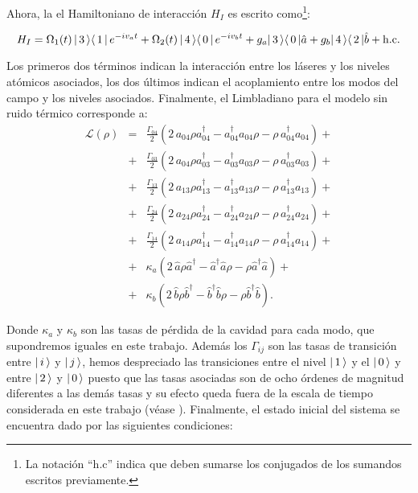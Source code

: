 \quad Ahora, la el Hamiltoniano de interacci\'on $H_I$ es escrito como\footnote{La notaci\'on ``h.c'' indica que deben sumarse los conjugados de los sumandos escritos previamente.}:

\begin{equation}
 H_I=\Omega_1(t)\,\vert\, 3 \,\rangle\langle\, 1 \,\vert\,e^{-iv_a t}+\Omega_2(t)\,\vert\, 4 \,\rangle\langle\, 0 \,\vert\,e^{-iv_bt}+g_a\vert\, 3 \,\rangle\langle\, 0 \,\vert\hat{a}+g_b\vert\, 4 \,\rangle\langle\, 2 \,\vert\hat{b}+\mbox{h.c}.\label{ec:HI}
\end{equation}

\quad Los primeros dos t\'erminos indican la interacci\'on entre los l\'aseres y los niveles at\'omicos asociados, los dos \'ultimos indican el acoplamiento entre los modos del campo y los niveles asociados. Finalmente, el Limbladiano para el modelo sin ruido t\'ermico corresponde a:
\begin{equation}
\begin{array}{lcl}
\mathcal{L}(\rho)&=&\frac{\Gamma_{04}}{2}(2\,a_{04}\rho a^\dag_{04}-a^\dag_{04} a_{04}\rho-\rho\,a^\dag_{04}a_{04})+\\
&+&\frac{\Gamma_{03}}{2}(2\,a_{04}\rho a^\dag_{03}-a^\dag_{03} a_{03}\rho-\rho\,a^\dag_{03}a_{03})+\\
&+&\frac{\Gamma_{13}}{2}(2\,a_{13}\rho a^\dag_{13}-a^\dag_{13} a_{13}\rho-\rho\,a^\dag_{13}a_{13})+\\
&+&\frac{\Gamma_{24}}{2}(2\,a_{24}\rho a^\dag_{24}-a^\dag_{24} a_{24}\rho-\rho\,a^\dag_{24}a_{24})+\\
&+&\frac{\Gamma_{14}}{2}(2\,a_{14}\rho a^\dag_{14}-a^\dag_{14} a_{14}\rho-\rho\,a^\dag_{14}a_{14})+\\

&+&\kappa_a(2\,\hat{a}\rho \hat{a}^\dag-\hat{a}^\dag\hat{a}\rho - \rho\hat{a}^\dag\hat{a} )+\\
&+&\kappa_b(2\,\hat{b}\rho \hat{b}^\dag-\hat{b}^\dag\hat{b}\rho - \rho\hat{b}^\dag\hat{b} ).

\end{array}\label{limbladiano}
\end{equation}

\quad Donde $\kappa_a$ y $\kappa_b$ son las tasas de p\'erdida de la cavidad para cada modo, que supondremos iguales en este trabajo. Adem\'as los $\Gamma_{ij}$ son las tasas de transici\'on entre $\vert\, i \,\rangle$ y $\vert\, j \,\rangle$, hemos despreciado las transiciones entre el nivel $\vert\, 1 \,\rangle$ y el $\vert\, 0 \,\rangle$ y entre $\vert\, 2 \,\rangle$ y $\vert\, 0 \,\rangle$ puesto que las tasas asociadas son de ocho \'ordenes de magnitud diferentes a las dem\'as tasas y su efecto queda fuera de la escala de tiempo considerada en este trabajo (v\'ease \cite{single-photon-walther}). Finalmente, el estado inicial del sistema se encuentra dado por las siguientes condiciones:

